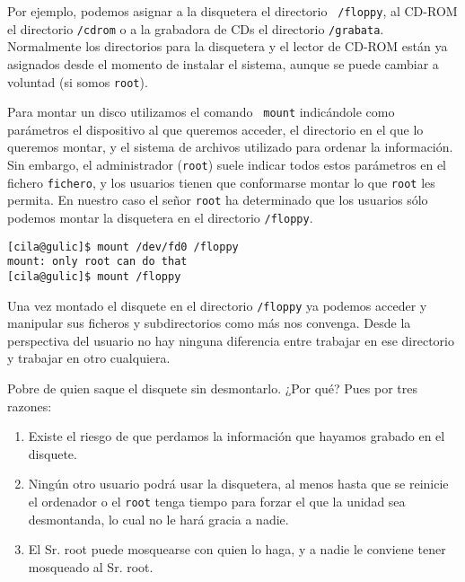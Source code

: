 Por  ejemplo,  podemos asignar  a  la  disquetera el  directorio  {\tt
/floppy}, al CD-ROM el directorio {\tt /cdrom} o a la grabadora de CDs
el  directorio {\tt  /grabata}.  Normalmente los  directorios para  la
disquetera y el  lector de CD-ROM están ya asignados  desde el momento
de instalar el  sistema, aunque se puede cambiar a  voluntad (si somos
{\tt root}).

Para    montar     un    disco    utilizamos    el     comando    {\tt
mount} indicándole como  parámetros el dispositivo
al que queremos acceder, el directorio en el que lo queremos montar, y
el  sistema de  archivos utilizado  para ordenar  la información.  Sin
embargo,  el  administrador ({\tt  root})  suele  indicar todos  estos
parámetros  en el  fichero {\tt  fichero}, y  los usuarios  tienen que
conformarse montar lo  que {\tt root} les permita. En  nuestro caso el
señor {\tt root}  ha determinado que los usuarios  sólo podemos montar
la disquetera en el directorio {\tt /floppy}.

\begin{verbatim}
[cila@gulic]$ mount /dev/fd0 /floppy
mount: only root can do that
[cila@gulic]$ mount /floppy
\end{verbatim}

Una vez montado el disquete en  el directorio {\tt /floppy} ya podemos
acceder  y  manipular  sus  ficheros y  subdirectorios  como  más  nos
convenga. Desde la  perspectiva del usuario no  hay ninguna diferencia
entre trabajar en ese directorio y trabajar en otro cualquiera.

Pobre de quien  saque el disquete sin desmontarlo. ¿Por  qué? Pues por
tres razones:

\begin{enumerate}

\item  Existe el  riesgo de  que perdamos  la información  que hayamos
grabado en el disquete.

\item Ningún otro usuario podrá usar la disquetera, al menos hasta que
se reinicie el  ordenador o el {\tt root} tenga  tiempo para forzar el
que la unidad sea desmontanda, lo cual no le hará gracia a nadie.

\item El  Sr. root puede  mosquearse con quien lo  haga, y a  nadie le
conviene tener mosqueado al Sr. root.

\end{enumerate}

